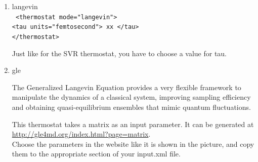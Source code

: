 \documentclass[a4paper,11pt]{scrartcl}
\begin{document}
\begin{itemize}
\begin{enumerate}
\item langevin \\
\texttt{ <thermostat mode="langevin">\\
         <tau units="femtosecond"> xx </tau>\\
         </thermostat>
      }

Just like for the SVR thermostat, you have to choose a value for tau.


\item gle  

The Generalized Langevin Equation provides a very flexible framework to manipulate the dynamics of a classical system, improving sampling efficiency and obtaining quasi-equilibrium ensembles that mimic quantum fluctuations.

\begin{minipage}[l]{0.6\textwidth}
This thermostat takes a matrix as an input parameter.
It can be generated at \href{http://gle4md.org/index.html?page=matrix}{http://gle4md.org/index.html?page=matrix}.\\
Choose the parameters in the website like it is shown in the picture, and copy them to the appropriate section of your input.xml file.
\end{minipage}


\end{enumerate}
\end{itemize}
\end{document}
